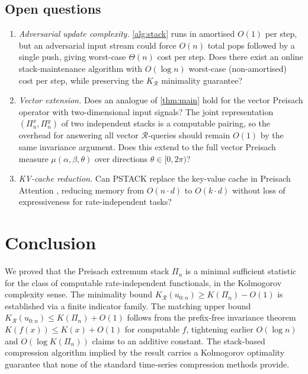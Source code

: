 \documentclass[preprint,12pt]{elsarticle}
\newcommand{\R}{\mathcal{R}}
\newcommand{\stack}{\Pi}
\begin{document}
\subsection{Open questions}

\begin{enumerate}
  \item \emph{Adversarial update complexity.}
    \cref{alg:stack} runs in amortised $O(1)$ per step, but
    an adversarial input stream could force $O(n)$ total pops
    followed by a single push, giving worst-case $\Theta(n)$ cost
    per step.
    Does there exist an online stack-maintenance algorithm
    with $O(\log n)$ worst-case (non-amortised) cost per step,
    while preserving the $K_{\R}$ minimality guarantee?
  \item \emph{Vector extension.} Does an analogue of
    \cref{thm:main} hold for the vector Preisach operator
    \citep{Frydrych2019} with two-dimensional input signals?
    The joint representation $(\stack^x_n, \stack^y_n)$ of two
    independent stacks is a computable pairing, so the overhead
    for answering all vector $\R$-queries should remain $O(1)$
    by the same invariance argument.
    Does this extend to the full vector Preisach measure
    $\mu(\alpha,\beta,\theta)$ over directions $\theta \in [0,2\pi)$?
  \item \emph{KV-cache reduction.} Can PSTACK replace the
    key-value cache in Preisach Attention \citep{Frydrych2025PAL},
    reducing memory from $O(n \cdot d)$ to $O(k \cdot d)$
    without loss of expressiveness for rate-independent tasks?
\end{enumerate}

\section{Conclusion}
\label{sec:conclusion}

We proved that the Preisach extremum stack $\stack_n$ is a
minimal sufficient statistic for the class of computable
rate-independent functionals, in the Kolmogorov complexity sense.
The minimality bound $K_{\R}(u_{0:n}) \geq K(\stack_n) - O(1)$
is established via a finite indicator family.
The matching upper bound $K_{\R}(u_{0:n}) \leq K(\stack_n) + O(1)$
follows from the prefix-free invariance theorem $K(f(x)) \leq
K(x) + O(1)$ for computable $f$, tightening earlier $O(\log n)$
and $O(\log K(\stack_n))$ claims to an additive constant.
The stack-based compression algorithm implied by the result
carries a Kolmogorov optimality guarantee that none of the
standard time-series compression methods provide.
\end{document}
